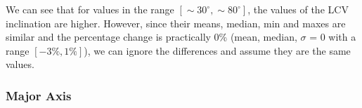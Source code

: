 \documentclass[
]{article}
\begin{document}
We can see that for values in the range
\([\sim 30^\circ,\sim 80^\circ]\), the values of the LCV inclination are
higher. However, since their means, median, min and maxes are similar
and the percentage change is practically 0\% (mean, median, \(\sigma\) =
0 with a range \([-3\%,1\%]\)), we can ignore the differences and assume
they are the same values.

\subsubsection{Major Axis}

\begin{figure}

\begin{minipage}{0.50\linewidth}



\end{minipage}%
%
\begin{minipage}{0.50\linewidth}

\end{minipage}
\end{figure}
\end{document}
